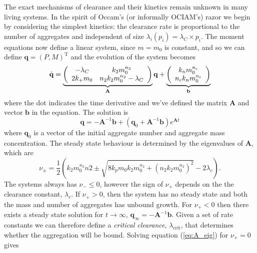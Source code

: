 The exact mechanisms of clearance and their kinetics remain unknown in many living systems. In the spirit of Occam's (or informally OCIAM's) razor we begin by considering the simplest kinetics: the clearance rate is proportional to the number of aggregates and independent of size $\lambda_i(p_i)=\lambda_C \times p_i$. The moment equations now define a linear system, since $m=m_0$ is constant, and so we can define $\textbf{q}=(P, M)^\text{T}$ and the evolution of the system becomes
\begin{equation}
    \dot{\textbf{q}} =
    \underbrace{\left(
    \begin{array}{cc}
    -\lambda_C & k_2 m_0^{n_2} \\
    2 k_+m_0 & n_2 k_2 m_0^{n_2}-\lambda_C  \\
    \end{array}
    \right)}
    _{\textbf{A}}
    \textbf{q}
    +
    \underbrace{\left(
    \begin{array}{c}
    k_n m_0^{n_{\mathrm{c}}} \\
    n_{\mathrm{c}} k_n m_0^{n_{\mathrm{c}}} \\
    \end{array}
    \right)}
    _{\textbf{b}}
    \label{eq:momentEvomatform}
\end{equation}
where the dot indicates the time derivative and we've defined the matrix $\textbf{A}$ and vector ${\textbf{b}}$ in the equation. The solution is 
\begin{equation}
    \textbf{q} = -\textbf{A}^{-1}\textbf{b}+\left(\textbf{q}_0+\textbf{A}^{-1}\textbf{b}\right)e^{\textbf{A}t}
    \label{eq:momentSolvematform}
\end{equation}
where $\textbf{q}_0$ is a vector of the initial aggregate number and aggregate mass concentration. The steady state behaviour is determined by the eigenvalues of $\textbf{A}$, which are
\begin{equation}
    \nu_{\pm} = \frac{1}{2} \left(k_2 m_0^{n_2} n2 \pm \sqrt{8 k_p m_0 k_2 m_0^{n_2} + \left(n_2 k_2 m_0^{n_2}\right)^2} - 2 \lambda_c \right).
    \label{eq:A_eig}
\end{equation}
The systems always has $\nu_{-} \leq 0$, however the sign of $\nu_+$ depends on the the clearance constant, $\lambda_c$. If $\nu_+>0$, then the system has no steady state and both the mass and number of aggregates has unbound growth. For $\nu_+<0$ then there exists a steady state solution for $t\rightarrow\infty$, $\textbf{q}_\infty = -\textbf{A}^{-1}\textbf{b}$. Given a set of rate constants we can therefore define a \textit{critical clearance}, $\lambda_{\text{crit}}$, that determines whether the aggregation will be bound. Solving equation (\ref{eq:A_eig}) for $\nu_+=0$ gives
